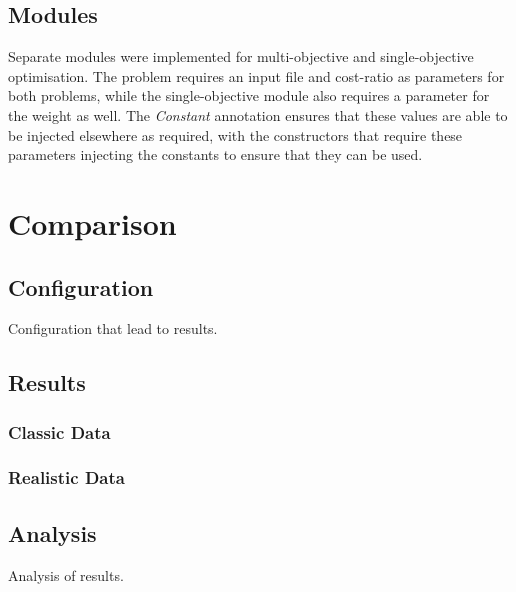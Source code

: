 \documentclass[11pt, a4paper]{article}
\begin{document}
\subsection{Modules} %
\label{sub:modules}
Separate modules were implemented for multi-objective and single-objective
optimisation. The problem requires an input file and cost-ratio as parameters
for both problems, while the single-objective module also requires a parameter
for the weight as well. The \emph{Constant} annotation ensures that these values
are able to be injected elsewhere as required, with the constructors that
require these parameters injecting the constants to ensure that they can be
used.

\newpage
\section{Comparison}
\label{sec:comparison}

\subsection{Configuration} %
\label{sub:configuration}
Configuration that lead to results.

\subsection{Results} %
\label{sub:results}
\subsubsection{Classic Data} %
\label{ssub:classic_data}


\subsubsection{Realistic Data} %
\label{ssub:realistic_data}


\subsection{Analysis} %
\label{sub:analysis}
Analysis of results.

% 
%  
\end{document}
